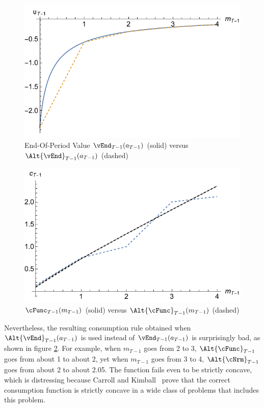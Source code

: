 \documentclass[titlepage, headings=optiontotocandhead]{\econtex}
\begin{document}
\hypertarget{PlotOTm1RawVSInt}{}
\begin{figure}
  \includegraphics{./Figures/PlotOTm1RawVSInt}
  \caption{End-Of-Period Value $\vEnd_{T-1}({a}_{T-1})$ (solid) versus $\Alt{\vEnd}_{T-1}({a}_{T-1})$ (dashed)}
  \label{fig:PlotOTm1RawVSInt}
\end{figure}

\hypertarget{PlotComparecTm1AB}{}
\begin{figure}
  \includegraphics{./Figures/PlotComparecTm1AB}
  \caption{$\cFunc_{T-1}({m}_{T-1})$ (solid) versus $\Alt{\cFunc}_{T-1}({m}_{T-1})$ (dashed)}
  \label{fig:PlotComparecTm1AB}
\end{figure}

Nevertheless, the resulting consumption rule obtained when $\Alt{\vEnd}_{T-1}({a}_{T-1})$
is used
instead of $\vEnd_{T-1}({a}_{T-1})$ is surprisingly bad, as
shown in figure \ref{fig:PlotComparecTm1AB}.  For example, when
${m}_{T-1}$ goes from 2 to 3, $\Alt{\cFunc}_{T-1}$ goes from about 1
to about 2, yet when ${m}_{T-1}$ goes from 3 to 4, $\Alt{\cNrm}_{T-1}$
goes from about 2 to about 2.05.  The function fails even to be
strictly concave, which is distressing because Carroll and
Kimball~\citeyearpar{ckConcavity} prove that the correct
consumption function is strictly concave in a wide class of problems that
includes this problem.
\end{document}
